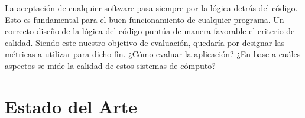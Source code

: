 \documentclass[a4paper,12pt]{book}
\begin{document}
	
	La aceptación de cualquier software pasa siempre por la lógica detrás del código. Esto es fundamental para el buen funcionamiento de cualquier programa. Un correcto diseño de la lógica del código puntúa de manera favorable el criterio de calidad. Siendo este nuestro objetivo de evaluación, quedaría por designar las métricas a utilizar para dicho fin. ¿Cómo evaluar la aplicación? ¿En base a cuáles aspectos se mide la calidad de estos sistemas de cómputo?
	
	\section{Estado del Arte}
		
	
		
		
\end{document}

